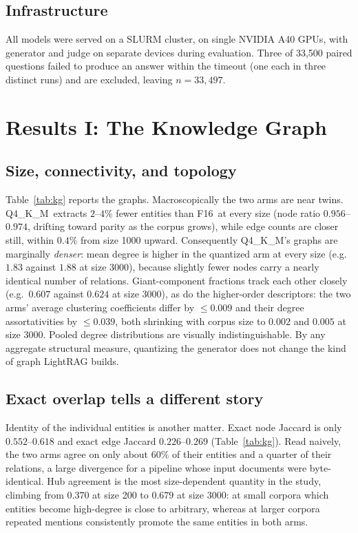 \documentclass[conference, table]{IEEEtran}
\newcommand{\fsixteen}{F16}
\newcommand{\qfour}{Q4\_K\_M}
\begin{document}
\subsection{Infrastructure}

\noindent
All models were served on a SLURM cluster, on single NVIDIA A40 GPUs, with generator and judge on separate devices during evaluation. Three of 33{,}500 paired questions failed to produce an answer within the timeout (one each in three distinct runs) and are excluded, leaving $n = 33{,}497$.



\section{Results I: The Knowledge Graph}\label{sec:kg}

\subsection{Size, connectivity, and topology}

\noindent
Table~\ref{tab:kg} reports the graphs. Macroscopically the two arms are near twins. \qfour\ extracts $2$--$4\%$ fewer entities than \fsixteen\ at every size (node ratio $0.956$--$0.974$, drifting toward parity as the corpus grows), while edge counts are closer still, within $0.4\%$ from size 1000 upward. Consequently \qfour's graphs are marginally \emph{denser}: mean degree is higher in the quantized arm at every size (e.g.\ $1.83$ against $1.88$ at size 3000), because slightly fewer nodes carry a nearly identical number of relations. Giant-component fractions track each other closely (e.g.\ $0.607$ against $0.624$ at size 3000), as do the higher-order descriptors: the two arms' average clustering coefficients differ by $\leq 0.009$ and their degree assortativities by $\leq 0.039$, both shrinking with corpus size to $0.002$ and $0.005$ at size 3000. Pooled degree distributions are visually indistinguishable. By any aggregate structural measure, quantizing the generator does not change the kind of graph LightRAG builds.

\subsection{Exact overlap tells a different story}

\noindent
Identity of the individual entities is another matter. Exact node Jaccard is only $0.552$--$0.618$ and exact edge Jaccard $0.226$--$0.269$ (Table~\ref{tab:kg}). Read naively, the two arms agree on only about $60\%$ of their entities and a quarter of their relations, a large divergence for a pipeline whose input documents were byte-identical. Hub agreement is the most size-dependent quantity in the study, climbing from $0.370$ at size 200 to $0.679$ at size 3000: at small corpora which entities become high-degree is close to arbitrary, whereas at larger corpora repeated mentions consistently promote the same entities in both arms.
\end{document}
